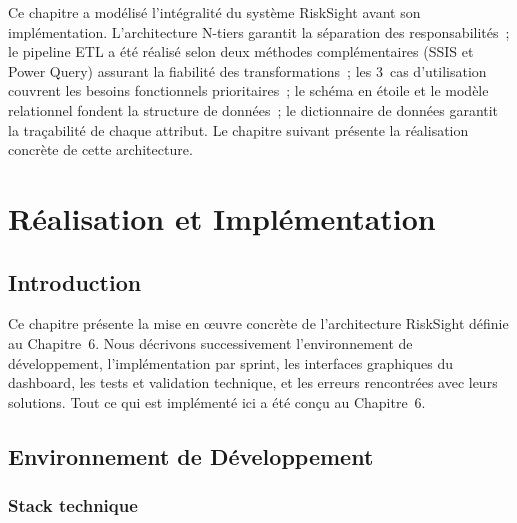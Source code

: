 \documentclass[12pt, a4paper]{report}
\begin{document}
Ce chapitre a modélisé l'intégralité du système RiskSight avant son implémentation.
L'architecture N-tiers garantit la séparation des responsabilités~; le pipeline ETL
a été réalisé selon deux méthodes complémentaires (SSIS et Power Query) assurant
la fiabilité des transformations~; les 3~cas d'utilisation couvrent les besoins
fonctionnels prioritaires~; le schéma en étoile et le modèle relationnel fondent
la structure de données~; le dictionnaire de données garantit la traçabilité de
chaque attribut. Le chapitre suivant présente la réalisation concrète de cette
architecture.

\chapter{Réalisation et Implémentation}

\section{Introduction}

Ce chapitre présente la mise en \oe uvre concrète de l'architecture RiskSight
définie au Chapitre~6. Nous décrivons successivement l'environnement de
développement, l'implémentation par sprint, les interfaces graphiques du dashboard,
les tests et validation technique, et les erreurs rencontrées avec leurs solutions.
Tout ce qui est implémenté ici a été conçu au Chapitre~6.

\section{Environnement de Développement}

\subsection{Stack technique}
\end{document}
